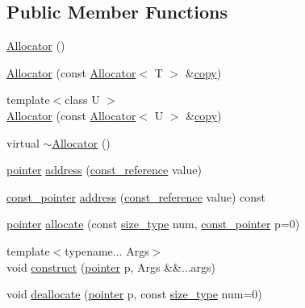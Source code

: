 \subsection*{Public Member Functions}
\begin{DoxyCompactItemize}
\item 
\hyperlink{classprism_1_1_allocator_a23e9458b3637d24fcb4d0a4feadac646}{Allocator} ()
\item 
\hyperlink{classprism_1_1_allocator_a974f6bcc97b9ad8cd3cba142f5c51ccf}{Allocator} (const \hyperlink{classprism_1_1_allocator}{Allocator}$<$ T $>$ \&\hyperlink{namespaceprism_ae776f4cd825f79e7af1cf6ee1d90a209}{copy})
\item 
{\footnotesize template$<$class U $>$ }\\\hyperlink{classprism_1_1_allocator_a87ddac6131f7b88ae2ff9bad3997a154}{Allocator} (const \hyperlink{classprism_1_1_allocator}{Allocator}$<$ U $>$ \&\hyperlink{namespaceprism_ae776f4cd825f79e7af1cf6ee1d90a209}{copy})
\item 
virtual \hyperlink{classprism_1_1_allocator_a3c220f4ea1fdb82ba53817cac0132c20}{$\sim$\+Allocator} ()
\item 
\hyperlink{classprism_1_1_allocator_ad3c6706a7243bd3ef489e16d34d5750f}{pointer} \hyperlink{classprism_1_1_allocator_afb90329306f4d3c8a29b3e715caa580c}{address} (\hyperlink{classprism_1_1_allocator_a89911899c97ae877a81b798957a2d899}{const\+\_\+reference} value)
\item 
\hyperlink{classprism_1_1_allocator_af6a4a91dfc203203ecc319a457ce4dce}{const\+\_\+pointer} \hyperlink{classprism_1_1_allocator_a2607cb18ace08eb0a509ec6bb5da74f0}{address} (\hyperlink{classprism_1_1_allocator_a89911899c97ae877a81b798957a2d899}{const\+\_\+reference} value) const 
\item 
\hyperlink{classprism_1_1_allocator_ad3c6706a7243bd3ef489e16d34d5750f}{pointer} \hyperlink{classprism_1_1_allocator_abd2088109382320f4233023d1fa8b39d}{allocate} (const \hyperlink{classprism_1_1_allocator_a47cb9435e4e9ff4c934ea3d4b4338d52}{size\+\_\+type} num, \hyperlink{classprism_1_1_allocator_af6a4a91dfc203203ecc319a457ce4dce}{const\+\_\+pointer} p=0)
\item 
{\footnotesize template$<$typename... Args$>$ }\\void \hyperlink{classprism_1_1_allocator_a499d6a8214f4ee6e094168ad5cf15a71}{construct} (\hyperlink{classprism_1_1_allocator_ad3c6706a7243bd3ef489e16d34d5750f}{pointer} p, Args \&\&...args)
\item 
void \hyperlink{classprism_1_1_allocator_aca700b82234799c7a1e90e89d40f7445}{deallocate} (\hyperlink{classprism_1_1_allocator_ad3c6706a7243bd3ef489e16d34d5750f}{pointer} p, const \hyperlink{classprism_1_1_allocator_a47cb9435e4e9ff4c934ea3d4b4338d52}{size\+\_\+type} num=0)

\end{DoxyCompactItemize}

